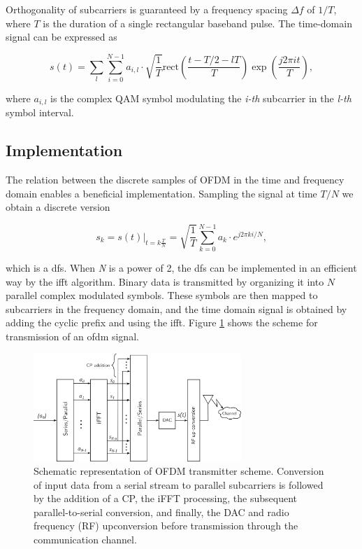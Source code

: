 Orthogonality of subcarriers is guaranteed by a frequency spacing $\Delta f$ of $1/T$, where $T$ is the duration of a single rectangular baseband pulse.
The time-domain signal can be expressed as

\begin{equation}
    s(t) = \sum_l\sum_{i=0}^{N-1} a_{i,l}\cdot \sqrt{\frac{1}{T}} \mathrm{rect} \left( \frac{t-T/2 - lT}{T} \right)\exp{\left(\frac{j2\pi it}{T}\right)},
\end{equation}

where $a_{i,l}$ is the complex QAM symbol modulating the \textit{i-th} subcarrier in the \textit{l-th} symbol interval.

\subsection{Implementation}
The relation between the discrete samples of OFDM in the time and frequency domain enables a beneficial implementation.
Sampling the signal at time $T/N$ we obtain a discrete version

\begin{equation}
    s_k = s(t)|_{t=k \frac{T}{N}} = \sqrt{\frac{1}{T}}\sum_{k=0}^{N-1} a_k \cdot e^{j2\pi ki/N},
\end{equation}

which is a \gls{dfs}. When \textit{N} is a power of 2, the \gls{dfs} can be implemented in an efficient way by the \gls{ifft} algorithm.
Binary data is transmitted by organizing it into $N$ parallel complex modulated symbols. These symbols are then mapped to subcarriers in the frequency domain, and the time domain signal is obtained by adding the cyclic prefix and using the \gls{ifft}. Figure \ref{fig:ofdm_transmit} shows the scheme for transmission of an \gls{ofdm} signal.

\begin{figure}[t]
	\centering
	\includegraphics[width=0.7\textwidth]{Images/theoretical/ofdm/ofdm_transmit.png}
	\caption{\small Schematic representation of OFDM transmitter scheme. Conversion of input data from a serial stream to parallel subcarriers is followed by  the addition of a CP, the iFFT processing, the subsequent parallel-to-serial conversion, and finally, the DAC and radio frequency (RF) upconversion before transmission through the communication channel.}
	\label{fig:ofdm_transmit}
\end{figure}


